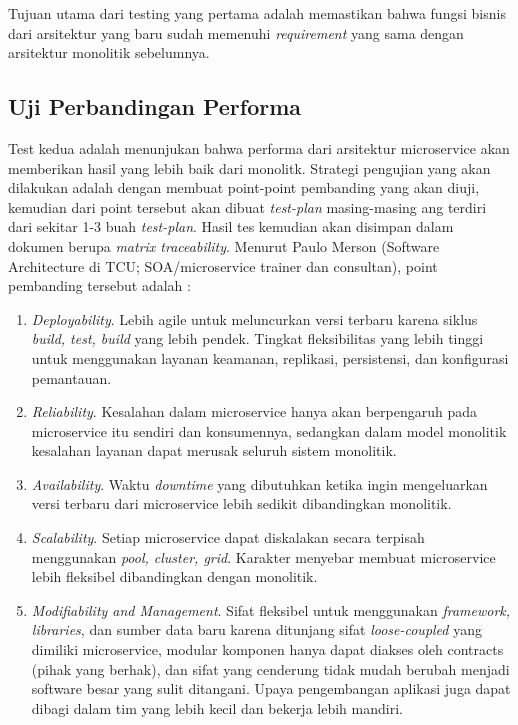 Tujuan utama dari testing yang pertama adalah memastikan bahwa fungsi bisnis dari arsitektur yang baru sudah memenuhi \textit{requirement} yang sama dengan arsitektur monolitik sebelumnya.
\subsection{Uji Perbandingan Performa}
Test kedua adalah menunjukan bahwa performa dari arsitektur microservice akan memberikan hasil yang lebih baik dari monolitk. Strategi pengujian yang akan dilakukan adalah dengan membuat point-point pembanding yang akan diuji, kemudian dari point tersebut akan dibuat \textit{test-plan} masing-masing ang terdiri dari sekitar 1-3 buah \textit{test-plan}. Hasil tes kemudian akan disimpan dalam dokumen berupa \textit{matrix traceability}.
Menurut Paulo Merson (Software Architecture di TCU; SOA/microservice trainer dan consultan), point pembanding tersebut adalah \cite{12}:
\begin{enumerate}[leftmargin=*]
	\item \textit{Deployability}. Lebih agile untuk meluncurkan versi terbaru karena siklus \textit{build, test, build} yang lebih pendek. Tingkat fleksibilitas yang lebih tinggi untuk menggunakan layanan keamanan, replikasi, persistensi, dan konfigurasi pemantauan.
	\item \textit{Reliability}. Kesalahan dalam microservice hanya akan berpengaruh pada microservice itu sendiri dan konsumennya, sedangkan dalam model monolitik kesalahan layanan dapat merusak seluruh sistem monolitik.
	\item \textit{Availability}. Waktu \textit{downtime} yang dibutuhkan ketika ingin mengeluarkan versi terbaru dari microservice lebih sedikit dibandingkan monolitik.
	\item \textit{Scalability}. Setiap microservice dapat diskalakan secara terpisah menggunakan \textit{pool, cluster, grid}. Karakter menyebar membuat microservice lebih fleksibel dibandingkan dengan monolitik.
	\item \textit{Modifiability and Management}. Sifat fleksibel untuk menggunakan \textit{framework, libraries}, dan sumber data baru karena ditunjang sifat \textit{loose-coupled} yang dimiliki microservice, modular komponen hanya dapat diakses oleh contracts (pihak yang berhak), dan sifat yang cenderung tidak mudah berubah menjadi software besar yang sulit ditangani. Upaya pengembangan aplikasi juga dapat dibagi dalam tim yang lebih kecil dan bekerja lebih mandiri. 
\end{enumerate}
